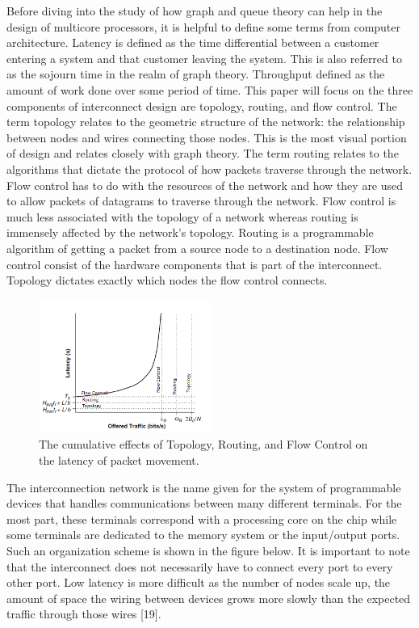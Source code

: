 \documentclass[letterpaper, 10 pt, conference]{ieeeconf}
\begin{document}
Before diving into the study of how graph and queue theory can help in the design of multicore processors, it is helpful to define some terms from computer architecture.  Latency is defined as the time differential between a customer entering a system and that customer leaving the system.  This is also referred to as the sojourn time in the realm of graph theory.  Throughput defined as the amount of work done over some period of time. This paper will focus on the three components of interconnect design are topology, routing, and flow control.   The term topology relates to the geometric structure of the network: the relationship between nodes and wires connecting those nodes.  This is the most visual portion of design and relates closely with graph theory.  The term routing relates to the algorithms that dictate the protocol of how packets traverse through the network.  Flow control has to do with the resources of the network and how they are used to allow packets of datagrams to traverse through the network.  Flow control is much less associated with the topology of a network whereas routing is immensely affected by the network's topology.  Routing is a programmable algorithm of getting a packet from a source node to a destination node.  Flow control consist of the hardware components that is part of the interconnect.  Topology dictates exactly which nodes the flow control connects.

\begin{figure}[!ht] %
	\centering
	\includegraphics [width=0.5\textwidth] {Traffic_vs_Latency.png} 
    \caption{The cumulative effects of Topology, Routing, and Flow Control on the latency of packet movement.}
\end{figure}


The interconnection network is the name given for the system of programmable devices that handles communications between many different terminals.  For the most part, these terminals correspond with a processing core on the chip while some terminals are dedicated to the memory system or the input/output ports.  Such an organization scheme is shown in the figure below.  It is important to note that the interconnect does not necessarily have to connect every port to every other port.  Low latency is more difficult as the number of nodes scale up, the amount of space the wiring between devices grows more slowly than the expected traffic through those wires [19].
\end{document}

